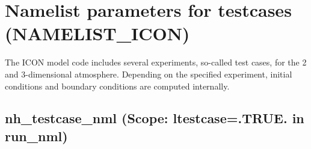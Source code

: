 \newpage

%

%
%



\section{Namelist parameters for testcases (NAMELIST\_ICON)}

The ICON model code includes several experiments, so-called test cases,
for the 2 and 3-dimensional atmosphere. Depending on the specified experiment,
initial conditions and boundary conditions are computed internally.



\subsection{nh\_testcase\_nml (Scope: ltestcase=.TRUE. in run\_nml)}

